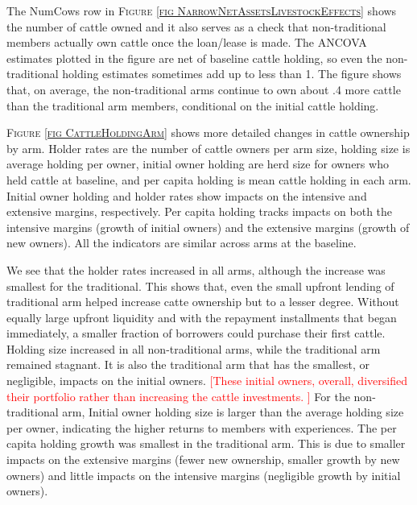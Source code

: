 	The \textsf{NumCows} row in \textsc{\footnotesize Figure \ref{fig NarrowNetAssetsLivestockEffects}} shows the number of cattle owned and it also serves as a check that non-\textsf{traditional} members actually own cattle once the loan/lease is made. The ANCOVA estimates plotted in the figure are net of baseline cattle holding, so even the non-traditional holding estimates sometimes add up to less than 1. %
	The figure shows that, on average, the non-\textsf{traditional} arms continue to own about .4 more cattle than the \textsf{traditional} arm members, conditional on the initial cattle holding. 
	
	\textsc{\footnotesize Figure \ref{fig CattleHoldingArm}} shows more detailed changes in cattle ownership by arm. Holder rates are the number of cattle owners per arm size, holding size is average holding per owner, initial owner holding are herd size for owners who held cattle at baseline, and per capita holding is mean cattle holding in each arm. Initial owner holding and holder rates show impacts on the intensive and extensive margins, respectively. Per capita holding tracks impacts on both the intensive margins (growth of initial owners) and the extensive margins (growth of new owners). All the indicators are similar across arms at the baseline. 
	
	We see that the holder rates increased in all arms, although the increase was smallest for the \textsf{traditional}. This shows that, even the small upfront lending of \textsf{traditional} arm helped increase catte ownership but to a lesser degree. Without equally large upfront liquidity and with the repayment installments that began immediately, a smaller fraction of borrowers could purchase their first cattle. Holding size increased in all non-\textsf{traditional} arms, while the \textsf{traditional} arm remained stagnant. It is also the \textsf{traditional} arm that has the smallest, or negligible, impacts on the initial owners. \textcolor{red}{[These initial owners, overall, diversified their portfolio rather than increasing the cattle investments. ]} For the non-\textsf{traditional} arm, Initial owner holding size is larger than the average holding size per owner, indicating the higher returns to members with experiences. The per capita holding growth was smallest in the \textsf{traditional} arm. This is due to smaller impacts on the extensive margins (fewer new ownership, smaller growth by new owners) and little impacts on the intensive margins (negligible growth by initial owners). 

